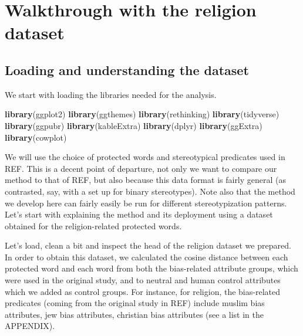 \documentclass[12pt,]{book}
\newenvironment{Shaded}{\begin{snugshade}}{\end{snugshade}}
\newcommand{\KeywordTok}[1]{\textcolor[rgb]{0.13,0.29,0.53}{\textbf{#1}}}
\newcommand{\NormalTok}[1]{#1}
\begin{document}
\chapter{Walkthrough with the religion
dataset}\label{walkthrough-with-the-religion-dataset}

\section{Loading and understanding the
dataset}\label{loading-and-understanding-the-dataset}

We start with loading the libraries needed for the analysis.

\footnotesize

\begin{Shaded}
\begin{Highlighting}[]
\KeywordTok{library}\NormalTok{(ggplot2)}
\KeywordTok{library}\NormalTok{(ggthemes)}
\KeywordTok{library}\NormalTok{(rethinking)}
\KeywordTok{library}\NormalTok{(tidyverse)}
\KeywordTok{library}\NormalTok{(ggpubr)}
\KeywordTok{library}\NormalTok{(kableExtra)}
\KeywordTok{library}\NormalTok{(dplyr)}
\KeywordTok{library}\NormalTok{(ggExtra)}
\KeywordTok{library}\NormalTok{(cowplot)}
\end{Highlighting}
\end{Shaded}

\normalsize 

We will use the choice of protected words and stereotypical predicates
used in REF. This is a decent point of departure, not only we want to
compare our method to that of REF, but also because this data format is
fairly general (as contrasted, say, with a set up for binary
stereotypes). Note also that the method we develop here can fairly
easily be run for different stereotypization patterns. Let's start with
explaining the method and its deployment using a dataset obtained for
the religion-related protected words.

Let's load, clean a bit and inspect the head of the religion dataset we
prepared. In order to obtain this dataset, we calculated the cosine
distance between each protected word and each word from both the
bias-related attribute groups, which were used in the original study,
and to neutral and human control attributes which we added as control
groups. For instance, for religion, the bias-related predicates (coming
from the original study in REF) include muslim bias attributes, jew bias
attributes, christian bias attributes (see a list in the APPENDIX).
\end{document}
